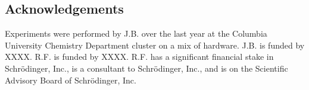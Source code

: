 \subsection*{Acknowledgements}
\label{subsec:acknowledgements}
Experiments were performed by J.B. over the last year at the Columbia University Chemistry Department cluster on a mix of hardware. 
J.B. is funded by XXXX.
R.F. is funded by XXXX. R.F. has a significant financial stake in Schr\"{o}dinger, Inc., is a consultant to Schr\"{o}dinger, Inc., and is on the Scientific Advisory Board of Schr\"{o}dinger, Inc.


